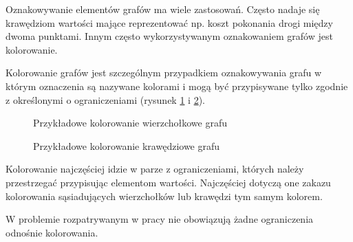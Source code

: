      Oznakowywanie elementów grafów ma wiele zastosowań. Często nadaje się krawędziom wartości mające reprezentować np.
     koszt pokonania drogi między dwoma punktami. Innym często wykorzystywanym oznakowaniem grafów jest kolorowanie.   
   
    \begin{definition}
      Kolorowanie grafów jest szczególnym przypadkiem oznakowywania grafu w którym oznaczenia są nazywane kolorami i mogą być przypisywane tylko zgodnie z określonymi o
       ograniczeniami (rysunek \ref{kolor3} i \ref{kolor4}). 
    \end{definition}

    \begin{figure}[H]
      \centering
        \caption{Przykładowe kolorowanie wierzchołkowe grafu}
        \label{kolor3}
     \end{figure}

    \begin{figure}[H]
      \centering
        \caption{Przykładowe kolorowanie krawędziowe grafu}
        \label{kolor4}
     \end{figure}

     Kolorowanie najczęściej idzie w parze z ograniczeniami, których należy przestrzegać przypisując elementom wartości.
     Najczęściej dotyczą one zakazu kolorowania sąsiadujących wierzchołków lub krawędzi tym samym kolorem. 
	
	W problemie rozpatrywanym w pracy nie obowiązują żadne ograniczenia odnośnie kolorowania.
